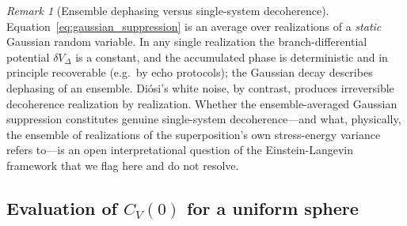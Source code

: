 \documentclass[12pt,a4paper]{article}
\theoremstyle{remark}
\newtheorem{remark}{Remark}
\begin{document}
\begin{remark}[Ensemble dephasing versus single-system decoherence]
\label{rem:dephasing}
Equation~\eqref{eq:gaussian_suppression} is an average over realizations of a
\emph{static} Gaussian random variable. In any single realization the branch-differential
potential $\delta V_\Delta$ is a constant, and the accumulated phase is deterministic and
in principle recoverable (e.g.\ by echo protocols); the Gaussian decay describes
dephasing of an ensemble. Di\'osi's white noise, by contrast, produces irreversible
decoherence realization by realization. Whether the ensemble-averaged Gaussian suppression
constitutes genuine single-system decoherence---and what, physically, the ensemble of
realizations of the superposition's own stress-energy variance refers to---is an open
interpretational question of the Einstein-Langevin framework that we flag here and do not
resolve.
\end{remark}

\subsection{Evaluation of $C_V(0)$ for a uniform sphere}
\end{document}
